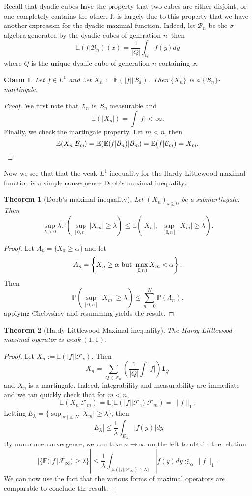 \documentclass[11pt]{article}
\newtheorem{thm}{Theorem}
\newtheorem*{claim}{Claim}
\theoremstyle{remark}
\newcommand{\calB}{\mathcal{B}}
\newcommand{\calF}{\mathcal{F}}
\newcommand{\1}{\textbf{1}}
\newcommand{\lle}{\lesssim}
\def\norm#1{\| #1  \|}
\newcommand{\bbP}{\mathbb{P}}
\newcommand{\bbE}{\mathbb{E}}
\begin{document}
Recall that dyadic cubes have the property that two cubes are either disjoint, or one completely contains the other. It is largely due to this property that we have another expression for the dyadic maximal function. Indeed, let $\calB_n$ be the $\sigma$-algebra generated by the dyadic cubes of generation $n$, then
\[
\bbE(f | \calB_n)(x) = \frac{1}{|Q|} \int_Q f(y) dy
\]
where $Q$ is the unique dyadic cube of generation $n$ containing $x$.
\begin{claim}
Let $f \in L^1$ and Let $X_n:=\bbE(|f| |\calB_n)$. Then $\{X_n\}$ is a $\{\calB_n\}$-martingale.
\end{claim}
\begin{proof}
We first note that $X_n$ is $\calB_n$ measurable and
\[
\bbE(|X_n|) = \int |f| < \infty.
\]
Finally, we check the martingale property. Let $m < n$, then
\[
\bbE(X_n | \calB_m) = \bbE(\bbE(f | \calB_n) | \calB_m) = \bbE(f | \calB_m) = X_m. \qedhere
\]
\end{proof}
Now we see that that the weak $L^1$ inequality for the Hardy-Littlewood maximal function is a simple consequence Doob's maximal inequality:
\begin{thm}[Doob's maximal inequality]
Let $(X_n)_{n \geq 0}$ be a submartingale. Then
\[
\sup_{\lambda > 0} \lambda \bbP\left( \sup_{[0,n]} |X_m| \geq \lambda\right) \leq \bbE\left(|X_n| ,\,\, \sup_{[0,n]} |X_m| \geq \lambda\right).
\]
\end{thm}
\begin{proof}
Let $A_0 = \{X_0 \geq \alpha\}$ and let
\[
A_n = \left\{ X_n \geq \alpha \textup{ but } \max_{[0,n)} X_m  < \alpha \right\}.
\]
Then
\[
\bbP\left( \sup_{[0,n]} |X_m| \geq \lambda\right)  \leq \sum_{n=0}^N \bbP(A_n).
\]
applying Chebyshev and resumming yields the result.
\end{proof}
\begin{thm}[Hardy-Littlewood Maximal inequality]
The Hardy-Littlewood maximal operator is weak-$(1,1)$.
\end{thm}
\begin{proof}
Let $X_n := \bbE(|f| | \calF_n)$. Then 
\[
X_n = \sum_{Q \in \calF_n} \left( \frac{1}{|Q|} \int |f| \right) \textbf{1}_Q
\]
and $X_n$ is a martingale. Indeed, integrability and measurability are immediate and we can quickly check that for $m < n$,
\[
\bbE(X_n | \calF_m ) = \bbE( \bbE(|f| | \calF_n) | \calF_m ) = \norm{f}_1.
\]
Letting $E_\lambda = \{\sup_{|m| \leq N} |X_m| \geq \lambda\}$, then
\[
|E_\lambda| \leq \frac{1}{\lambda} \int_{E_\lambda} |f(y)| dy
\]
By monotone convergence, we can take $n \to \infty$ on the left to obtain the relation
\[
|\{\bbE(|f| | \calF_\infty) \geq \lambda \}| \leq \frac{1}{\lambda} \int_{\{\bbE(|f| | \calF_\infty) \geq \lambda \}} |f(y) dy \lle_\alpha \norm{f}_1.
\]
We can now use the fact that the various forms of maximal operators are comparable to conclude the result.
\end{proof}
\end{document}
